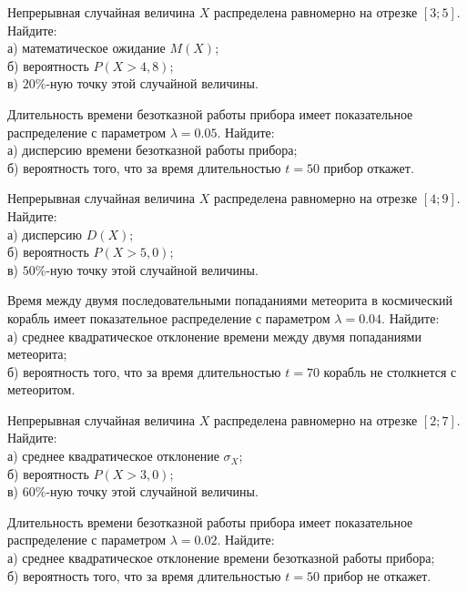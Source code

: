 \vfill

\newpage\setcounter{zad}{0}

\z Непрерывная случайная величина $X$ распределена равномерно на отрезке $[3; 5]$. Найдите: \\ \quad а) математическое ожидание $M(X)$; \\ \quad б) вероятность $P(X>4{,}8)$; \\ \quad в) $20\%$-ную точку этой случайной величины.


\vfill

\z Длительность времени безотказной работы прибора имеет показательное распределение с параметром $\lambda = 0.05$. Найдите: \\ \quad а) дисперсию времени безотказной работы прибора; \\ \quad б) вероятность того, что за время длительностью $t = 50$ прибор  откажет.
 

\vfill

\newpage\setcounter{zad}{0}

\z Непрерывная случайная величина $X$ распределена равномерно на отрезке $[4; 9]$. Найдите: \\ \quad а) дисперсию $D(X)$; \\ \quad б) вероятность $P(X>5{,}0)$; \\ \quad в) $50\%$-ную точку этой случайной величины.


\vfill

\z Время между двумя последовательными попаданиями метеорита в космический корабль имеет показательное распределение с параметром $\lambda = 0.04$. Найдите: \\ \quad а) среднее квадратическое отклонение времени между двумя попаданиями метеорита; \\ \quad б) вероятность того, что за время длительностью $t = 70$ корабль не столкнется с метеоритом.
 

\vfill

\newpage\setcounter{zad}{0}

\z Непрерывная случайная величина $X$ распределена равномерно на отрезке $[2; 7]$. Найдите: \\ \quad а) среднее квадратическое отклонение $\sigma_X$; \\ \quad б) вероятность $P(X>3{,}0)$; \\ \quad в) $60\%$-ную точку этой случайной величины.


\vfill

\z Длительность времени безотказной работы прибора имеет показательное распределение с параметром $\lambda = 0.02$. Найдите: \\ \quad а) среднее квадратическое отклонение времени безотказной работы прибора; \\ \quad б) вероятность того, что за время длительностью $t = 50$ прибор не откажет.
 

